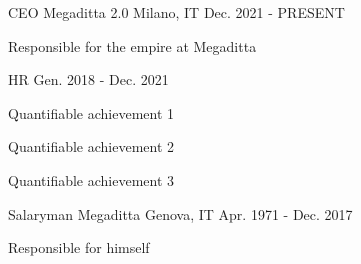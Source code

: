 
\begin{cventries}

	\cventry
	{CEO} %
	{Megaditta 2.0} %
	{Milano, IT} %
	{Dec. 2021 - PRESENT} %
	{
		\begin{cvitems} %
			\item{Responsible for the empire at Megaditta}
			\item{}
		\end{cvitems}
	}

  \cventry
    {HR} %
    {} %
    {} %
    {Gen. 2018 - Dec. 2021} %
    {
      \begin{cvitems} %
        \item {Quantifiable achievement 1}
        \item {Quantifiable achievement 2}
        \item {Quantifiable achievement 3}
      \end{cvitems}
    }

\smallskip

	\cventry
	{Salaryman} %
	{Megaditta} %
	{Genova, IT} %
	{Apr. 1971 - Dec. 2017} %
	{
		\begin{cvitems} %
			\item{Responsible for himself}
			\item{}
			\item {}
		\end{cvitems}
	}
\end{cventries}
